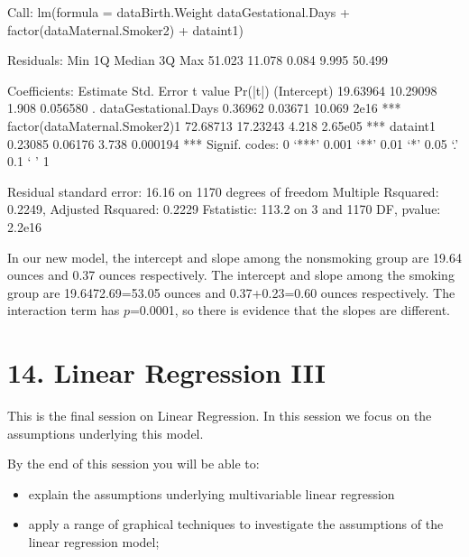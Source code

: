 \documentclass[letterpaper,10pt,english]{jupyterBook}
\begin{document}
\begin{sphinxVerbatim}[commandchars=\\\{\}]
Call:
lm(formula = data\PYGZdl{}Birth.Weight \PYGZti{} data\PYGZdl{}Gestational.Days + factor(data\PYGZdl{}Maternal.Smoker2) + 
    data\PYGZdl{}int1)

Residuals:
    Min      1Q  Median      3Q     Max 
\PYGZhy{}51.023 \PYGZhy{}11.078  \PYGZhy{}0.084   9.995  50.499 

Coefficients:
                                Estimate Std. Error t value Pr(\PYGZgt{}|t|)    
(Intercept)                     19.63964   10.29098   1.908 0.056580 .  
data\PYGZdl{}Gestational.Days            0.36962    0.03671  10.069  \PYGZlt{} 2e\PYGZhy{}16 ***
factor(data\PYGZdl{}Maternal.Smoker2)1 \PYGZhy{}72.68713   17.23243  \PYGZhy{}4.218 2.65e\PYGZhy{}05 ***
data\PYGZdl{}int1                        0.23085    0.06176   3.738 0.000194 ***
\PYGZhy{}\PYGZhy{}\PYGZhy{}
Signif. codes:  0 ‘***’ 0.001 ‘**’ 0.01 ‘*’ 0.05 ‘.’ 0.1 ‘ ’ 1

Residual standard error: 16.16 on 1170 degrees of freedom
Multiple R\PYGZhy{}squared:  0.2249,	Adjusted R\PYGZhy{}squared:  0.2229 
F\PYGZhy{}statistic: 113.2 on 3 and 1170 DF,  p\PYGZhy{}value: \PYGZlt{} 2.2e\PYGZhy{}16
\end{sphinxVerbatim}

\noindent{}

\sphinxAtStartPar
In our new model, the intercept and slope among the non\sphinxhyphen{}smoking group are 19.64 ounces and 0.37 ounces respectively. The intercept and slope among the smoking group are 19.64\sphinxhyphen{}72.69=\sphinxhyphen{}53.05 ounces and  0.37+0.23=0.60 ounces respectively. The interaction term has \(p\)=0.0001, so there is evidence that the slopes are different.


\chapter{14. Linear Regression III}
\label{\detokenize{14.a. Linear Regression III:linear-regression-iii}}\label{\detokenize{14.a. Linear Regression III::doc}}
\sphinxAtStartPar
This is the final session on Linear Regression. In this session we focus on the assumptions underlying this model.



\sphinxAtStartPar
By the end of this session you will be able to:
\begin{itemize}
\item {} 
\sphinxAtStartPar
explain the assumptions underlying multivariable linear regression

\item {} 
\sphinxAtStartPar
apply a range of graphical techniques to investigate the assumptions of the linear regression model;

\end{itemize}
\end{document}
